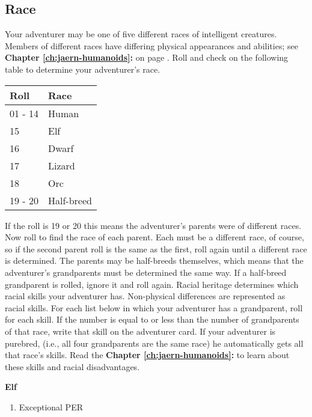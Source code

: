 \begin{multicols*}{2}
\section{Race}
Your adventurer may be one of five different races of intelligent creatures. Members of different races have differing physical appearances and abilities; see \textbf{Chapter \ref{ch:jaern-humanoids}: } on page \textbf{\pageref{ch:jaern-humanoids}}. Roll  and check on the following table to determine your adventurer's race.
\begin{tcolorbox}[boxrule=0pt,title=\textbf{Race Roll}]
\begin{tabular}{l l}
Roll & Race\\
\midrule
01 - 14 & Human\\
15 & Elf\\
16 & Dwarf \\
17 & Lizard\\
18 & Orc\\
19 - 20 & Half-breed\\
\end{tabular}
\end{tcolorbox}
If the roll is 19 or 20 this means the adventurer's parents were of different races. Now roll to find the race of each parent. Each must be a different race, of course, so if the second parent roll is the same as the first, roll again until a different race is determined. The parents may be half-breeds themselves, which means that the adventurer's grandparents must be determined the same way. If a half-breed grandparent is rolled, ignore it and roll again. Racial heritage determines which racial skills your adventurer has. Non-physical differences are represented as racial skills. For each list below in which your adventurer has a grandparent, roll  for each skill. If the number is equal to or less than the number of grandparents of that race, write that skill on the adventurer card. If your adventurer is purebred, (i.e., all four grandparents are the same race) he automatically gets all that race's skills. Read the \textbf{Chapter \ref{ch:jaern-humanoids}: } to learn about these skills and racial disadvantages.
\setlength{\columnsep}{0.05cm}
\begin{multicols}{2}
\begin{tcolorbox}[breakable,boxrule=0pt,after skip=0pt]
\textbf{Elf}
\begin{enumerate}[leftmargin=0.1cm]
\item Exceptional PER

\end{enumerate}
\end{tcolorbox}
\end{multicols}
\end{multicols*}
